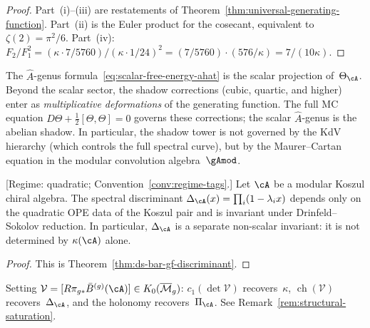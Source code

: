 \begin{proof}
Part~(i)--(iii) are restatements of
Theorem~\ref{thm:universal-generating-function}.
Part~(ii) is the Euler product for the cosecant,
equivalent to $\zeta(2) = \pi^2/6$.
Part~(iv): $F_2/F_1^2 = (\kappa\cdot 7/5760)/(\kappa\cdot
1/24)^2 = (7/5760)\cdot(576/\kappa) = 7/(10\kappa)$.
\end{proof}

\begin{remark}
\label{rem:shadow-multiplicative-deformation}
The $\hat{A}$-genus formula~\eqref{eq:scalar-free-energy-ahat}
is the scalar projection of~$\Theta_\cA$.  Beyond the scalar
sector, the shadow corrections (cubic, quartic, and higher)
enter as \emph{multiplicative deformations} of the
generating function.  The full MC equation
$D\Theta + \frac{1}{2}[\Theta,\Theta] = 0$
governs these corrections; the scalar $\hat{A}$-genus is
the abelian shadow.  In particular, the shadow tower is not
governed by the KdV hierarchy (which controls the full
spectral curve), but by the Maurer--Cartan equation in the
modular convolution algebra~$\gAmod$.
\end{remark}

\begin{theorem}
\label{thm:spectral-characteristic}

\smallskip\noindent
\textup{[Regime: quadratic;
Convention~\ref{conv:regime-tags}.]}
Let $\cA$ be a modular Koszul chiral algebra.
The spectral discriminant
$\Delta_{\cA}(x) = \prod_i (1 - \lambda_i x)$
depends only on the quadratic OPE data of the Koszul pair and is invariant
under Drinfeld--Sokolov reduction.
In particular, $\Delta_{\cA}$ is a separate non-scalar invariant:
it is not determined by $\kappa(\cA)$ alone.
\end{theorem}

\begin{proof}
This is Theorem~\ref{thm:ds-bar-gf-discriminant}.
\end{proof}

\begin{remark}\label{rem:spectral-characteristic-programme}
Setting $\mathcal{V}=[R\pi_{g*}\bar{B}^{(g)}(\cA)]\in
K_0(\overline{\mathcal{M}}_g)$: $c_1(\det\mathcal{V})$
recovers~$\kappa$, $\operatorname{ch}(\mathcal{V})$
recovers~$\Delta_{\cA}$, and the holonomy recovers~$\Pi_{\cA}$.
See Remark~\ref{rem:structural-saturation}.
\end{remark}

